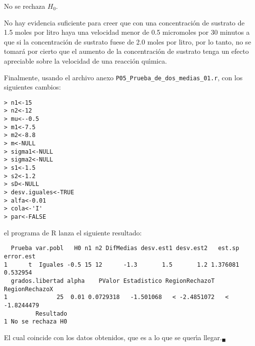 \begin{solucion}
 \begin{decision}
  No se rechaza $H_0$.
 \end{decision}

 \begin{conclusion}
  No hay evidencia suficiente para creer que con una concentraci\'on de sustrato de 1.5 moles por litro haya una velocidad menor de 0.5 micromoles por 30 minutos a que si la concentraci\'on de sustrato fuese de 2.0 moles por litro, por lo tanto, no se tomar\'a por cierto que el aumento de la concentraci\'on de sustrato tenga un efecto apreciable sobre la velocidad de una reacci\'on qu\'{\i}mica.
 \end{conclusion}

 Finalmente, usando el archivo anexo
 \texttt{P05\_Prueba\_de\_dos\_medias\_01.r},
 con los siguientes cambios:
 \begin{verbatim}
> n1<-15
> n2<-12
> mu<--0.5
> m1<-7.5
> m2<-8.8
> m<-NULL
> sigma1<-NULL
> sigma2<-NULL
> s1<-1.5
> s2<-1.2
> sD<-NULL
> desv.iguales<-TRUE
> alfa<-0.01
> cola<-'I'
> par<-FALSE
 \end{verbatim}
 \vspace{-0.5cm}
 el programa de R lanza el siguiente resultado:
 \begin{verbatim}
  Prueba var.pobl   H0 n1 n2 DifMedias desv.est1 desv.est2   est.sp error.est
1      t  Iguales -0.5 15 12      -1.3       1.5       1.2 1.376081  0.532954
  grados.libertad alpha    PValor Estadistico RegionRechazoT RegionRechazoX
1              25  0.01 0.0729318   -1.501068   < -2.4851072   < -1.8244479
         Resultado
1 No se rechaza H0
 \end{verbatim}
 \vspace{-0.5cm}
 El cual coincide con los datos obtenidos,
 que es a lo que se quer\'{\i}a llegar.${}_{\blacksquare}$
\end{solucion}

